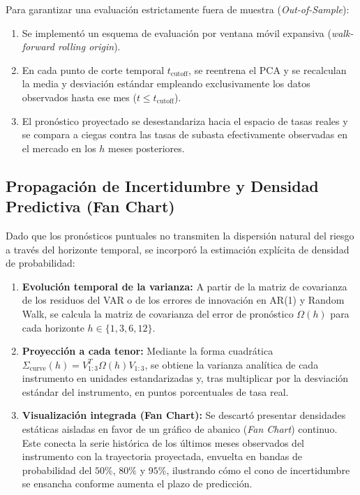 \documentclass[11pt]{article}
\begin{document}
Para garantizar una evaluación estrictamente fuera de muestra (\textit{Out-of-Sample}):
\begin{enumerate}
    \item Se implementó un esquema de evaluación por ventana móvil expansiva (\textit{walk-forward rolling origin}).
    \item En cada punto de corte temporal $t_{\text{cutoff}}$, se reentrena el PCA y se recalculan la media y desviación estándar empleando exclusivamente los datos observados hasta ese mes ($t \le t_{\text{cutoff}}$).
    \item El pronóstico proyectado se desestandariza hacia el espacio de tasas reales y se compara a ciegas contra las tasas de subasta efectivamente observadas en el mercado en los $h$ meses posteriores.
\end{enumerate}

\subsection{Propagación de Incertidumbre y Densidad Predictiva (Fan Chart)}

Dado que los pronósticos puntuales no transmiten la dispersión natural del riesgo a través del horizonte temporal, se incorporó la estimación explícita de densidad de probabilidad:

\begin{enumerate}
    \item \textbf{Evolución temporal de la varianza:} A partir de la matriz de covarianza de los residuos del VAR o de los errores de innovación en AR(1) y Random Walk, se calcula la matriz de covarianza del error de pronóstico $\Omega(h)$ para cada horizonte $h \in \{1, 3, 6, 12\}$.
    \item \textbf{Proyección a cada tenor:} Mediante la forma cuadrática $\Sigma_{\text{curve}}(h) = V_{1:3}^T \Omega(h) V_{1:3}$, se obtiene la varianza analítica de cada instrumento en unidades estandarizadas y, tras multiplicar por la desviación estándar del instrumento, en puntos porcentuales de tasa real.
    \item \textbf{Visualización integrada (Fan Chart):} Se descartó presentar densidades estáticas aisladas en favor de un gráfico de abanico (\textit{Fan Chart}) continuo. Este conecta la serie histórica de los últimos meses observados del instrumento con la trayectoria proyectada, envuelta en bandas de probabilidad del $50\%$, $80\%$ y $95\%$, ilustrando cómo el cono de incertidumbre se ensancha conforme aumenta el plazo de predicción.
\end{enumerate}
\end{document}
